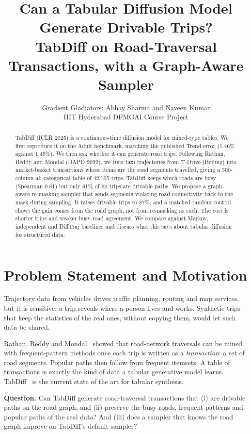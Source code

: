 \documentclass[10pt,twocolumn,a4paper]{article}
\title{\textbf{Can a Tabular Diffusion Model Generate Drivable Trips?}\\[2pt]
\large TabDiff on Road-Traversal Transactions, with a Graph-Aware Sampler}
\author{Gradient Gladiators: Abhay Sharma and Naveen Kumar\\
\small IIIT Hyderabad \quad DFMGAI Course Project}
\date{}
\begin{document}
\maketitle

\begin{abstract}
TabDiff (ICLR 2025) is a continuous-time diffusion model for mixed-type tables. We first reproduce it on
the Adult benchmark, matching the published Trend error (1.46\% against 1.49\%). We then ask whether it can
generate road trips. Following Rathan, Reddy and Mondal (DAPD 2022), we turn taxi trajectories from T-Drive
(Beijing) into market-basket transactions whose items are the road segments travelled, giving a
300-column all-categorical table of 42,705 trips. TabDiff keeps which roads are busy (Spearman 0.81) but
only 61\% of its trips are drivable paths. We propose a graph-aware re-masking sampler that sends
segments violating road connectivity back to the mask during sampling. It raises drivable trips to 87\%,
and a matched random control shows the gain comes from the road graph, not from re-masking as such. The
cost is shorter trips and weaker busy-road agreement. We compare against Markov, independent and
DiffTraj baselines and discuss what this says about tabular diffusion for structured data.
\end{abstract}

\section{Problem Statement and Motivation}
\label{sec:a}
Trajectory data from vehicles drives traffic planning, routing and map services, but it is sensitive: a
trip reveals where a person lives and works. Synthetic trips that keep the statistics of the real ones,
without copying them, would let such data be shared.

Rathan, Reddy and Mondal~\cite{reddy2022} showed that road-network traversals can be mined with
frequent-pattern methods once each trip is written as a \emph{transaction}: a set of road segments. Popular
paths then follow from frequent itemsets. A table of transactions is exactly the kind of data a tabular
generative model learns. TabDiff~\cite{tabdiff} is the current state of the art for tabular synthesis.

\textbf{Question.} Can TabDiff generate road-traversal transactions that (i) are drivable paths on the road
graph, and (ii) preserve the busy roads, frequent patterns and popular paths of the real data? And
(iii) does a sampler that knows the road graph improve on TabDiff's default sampler?
\end{document}
